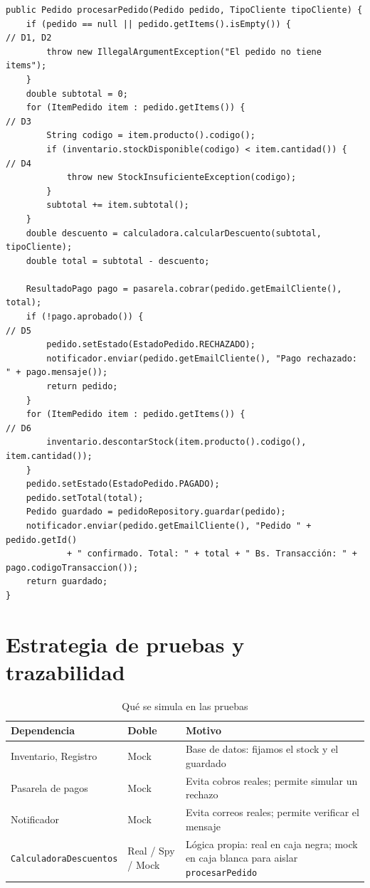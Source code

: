 \documentclass[11pt,a4paper,oneside]{report}
\newcommand{\code}[1]{\texttt{#1}}
\begin{document}
\begin{lstlisting}[caption={Método \code{procesarPedido} con sus decisiones marcadas (D1--D6)},label={lst:sut}]
public Pedido procesarPedido(Pedido pedido, TipoCliente tipoCliente) {
    if (pedido == null || pedido.getItems().isEmpty()) {                 // D1, D2
        throw new IllegalArgumentException("El pedido no tiene items");
    }
    double subtotal = 0;
    for (ItemPedido item : pedido.getItems()) {                          // D3
        String codigo = item.producto().codigo();
        if (inventario.stockDisponible(codigo) < item.cantidad()) {      // D4
            throw new StockInsuficienteException(codigo);
        }
        subtotal += item.subtotal();
    }
    double descuento = calculadora.calcularDescuento(subtotal, tipoCliente);
    double total = subtotal - descuento;

    ResultadoPago pago = pasarela.cobrar(pedido.getEmailCliente(), total);
    if (!pago.aprobado()) {                                              // D5
        pedido.setEstado(EstadoPedido.RECHAZADO);
        notificador.enviar(pedido.getEmailCliente(), "Pago rechazado: " + pago.mensaje());
        return pedido;
    }
    for (ItemPedido item : pedido.getItems()) {                          // D6
        inventario.descontarStock(item.producto().codigo(), item.cantidad());
    }
    pedido.setEstado(EstadoPedido.PAGADO);
    pedido.setTotal(total);
    Pedido guardado = pedidoRepository.guardar(pedido);
    notificador.enviar(pedido.getEmailCliente(), "Pedido " + pedido.getId()
            + " confirmado. Total: " + total + " Bs. Transacción: " + pago.codigoTransaccion());
    return guardado;
}
\end{lstlisting}

\section{Estrategia de pruebas y trazabilidad}
\begin{table}[H]
\centering
\caption{Qué se simula en las pruebas}
\small
\begin{tabularx}{\linewidth}{llX}
\toprule
\textbf{Dependencia} & \textbf{Doble} & \textbf{Motivo}\\
\midrule
Inventario, Registro & Mock & Base de datos: fijamos el stock y el guardado\\
Pasarela de pagos & Mock & Evita cobros reales; permite simular un rechazo\\
Notificador & Mock & Evita correos reales; permite verificar el mensaje\\
\code{CalculadoraDescuentos} & Real / Spy / Mock & Lógica propia: real en caja negra; mock en caja blanca para aislar \code{procesarPedido}\\
\bottomrule
\end{tabularx}
\end{table}
\end{document}
